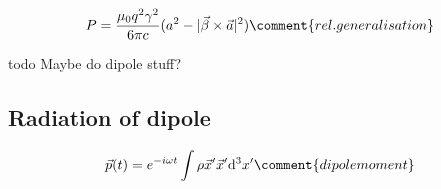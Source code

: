 \begin{equation*}
    P = \frac{\mu_{0} q^{2} \gamma^{2}}{6 \pi c} (a^{2} - |\vec{\beta} \times \vec{a}|^{2}) \comment{rel. generalisation}
\end{equation*}

todo Maybe do dipole stuff?
\subsection{Radiation of dipole}
\begin{equation}
    \vec{p}(t) = e^{-i \omega t}\int \rho{\vec{x}^{\prime}} \vec{x}^{\prime} \mathrm{d}^{3}x^{\prime} \comment{dipole moment}
\end{equation}

